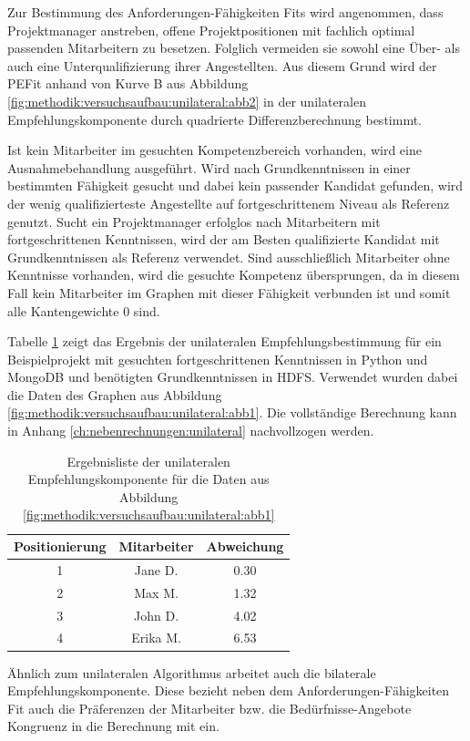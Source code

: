 Zur Bestimmung des Anforderungen-Fähigkeiten Fits wird angenommen, dass Projektmanager anstreben, offene Projektpositionen mit fachlich optimal passenden Mitarbeitern zu besetzen. Folglich vermeiden sie sowohl eine Über- als auch eine Unterqualifizierung ihrer Angestellten. Aus diesem Grund wird der \ac{PEFit} anhand von Kurve B aus Abbildung \ref{fig:methodik:versuchsaufbau:unilateral:abb2} in der unilateralen Empfehlungskomponente durch quadrierte Differenzberechnung bestimmt.

Ist kein Mitarbeiter im gesuchten Kompetenzbereich vorhanden, wird eine Ausnahmebehandlung ausgeführt. Wird nach Grundkenntnissen in einer bestimmten Fähigkeit gesucht und dabei kein passender Kandidat gefunden, wird der wenig qualifizierteste Angestellte auf fortgeschrittenem Niveau als Referenz genutzt. Sucht ein Projektmanager erfolglos nach Mitarbeitern mit fortgeschrittenen Kenntnissen, wird der am Besten qualifizierte Kandidat mit Grundkenntnissen als Referenz verwendet. Sind ausschließlich Mitarbeiter ohne Kenntnisse vorhanden, wird die gesuchte Kompetenz übersprungen, da in diesem Fall kein Mitarbeiter im Graphen mit dieser Fähigkeit verbunden ist und somit alle Kantengewichte 0 sind.

Tabelle \ref{tbl:methodik:versuchsaufbau:unilateral:tbl2} zeigt das Ergebnis der unilateralen Empfehlungsbestimmung für ein Beispielprojekt mit gesuchten fortgeschrittenen Kenntnissen in Python und MongoDB und benötigten Grundkenntnissen in HDFS. Verwendet wurden dabei die Daten des Graphen aus Abbildung \ref{fig:methodik:versuchsaufbau:unilateral:abb1}. Die vollständige Berechnung kann in Anhang \ref{ch:nebenrechnungen:unilateral} nachvollzogen werden.

\begin{table}[h]
	\centering
	\begin{tabular}{c|c|c}
		Positionierung & Mitarbeiter & Abweichung\\
		\hline
		1 & Jane D.  & 0.30\\
		2 & Max M.   & 1.32\\
		3 & John D.  & 4.02\\
		4 & Erika M. & 6.53
	\end{tabular}
	\caption{Ergebnisliste der unilateralen Empfehlungskomponente für die Daten aus Abbildung \ref{fig:methodik:versuchsaufbau:unilateral:abb1}}
	\label{tbl:methodik:versuchsaufbau:unilateral:tbl2}
\end{table}

Ähnlich zum unilateralen Algorithmus arbeitet auch die bilaterale Empfehlungskomponente. Diese bezieht neben dem Anforderungen-Fähigkeiten Fit auch die Präferenzen der Mitarbeiter bzw. die Bedürfnisse-Angebote Kongruenz in die Berechnung mit ein.

